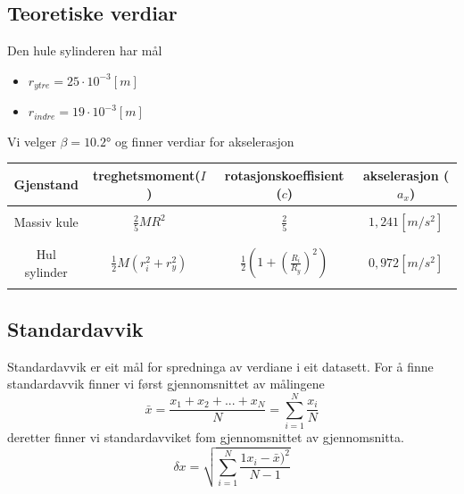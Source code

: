 \documentclass[12pt,a4paper]{article}
\begin{document}
  \subsection{Teoretiske verdiar}
  Den hule sylinderen har mål
  \begin{itemize}
    \item $r_{ytre} = 25\cdot10^{-3}[m]$
    \item $r_{indre} = 19\cdot10^{-3}[m]$
  \end{itemize}
  Vi velger $\beta = \ang{10.2}$ og finner verdiar for akselerasjon
  \begin{center}
    \begin{tabular}{|c|c|c|c|}
      \hline
      Gjenstand &  treghetsmoment($I$)  &  rotasjonskoeffisient ($c$)  &  
      akselerasjon ($a_x$) \\
      \hline
      &&&\\
      Massiv kule  &  $\frac{2}{5}MR^2$ &  $\frac{2}{5}$  &  $1,241[m/s^2]$ \\
      &&&\\
      \hline
      &&&\\
      Hul sylinder  &  $\frac{1}{2}M(r^2_i + r^2_y)$ &  
      $\frac{1}{2}\left( 1 + \left(\frac{R_i}{R_y}\right) ^2 \right)$  &  $0,972[m/s^2]$ \\
      &&&\\
      \hline
    \end{tabular}
  \end{center}

  \subsection{Standardavvik}
  Standardavvik er eit mål for spredninga av verdiane i eit datasett.
  For å finne standardavvik finner vi først gjennomsnittet av målingene
  \begin{equation}
    \bar{x} = \frac{x_1 + x_2 + ... + x_N}{N} = \sum_{i=1}^{N} \frac{x_i}{N}
  \end{equation}
  deretter finner vi standardavviket fom gjennomsnittet av gjennomsnitta.
  \begin{equation}
    \delta x = \sqrt{ \sum_{i=1}^{N} \frac{1x_i - \bar{x}) ^2}{N - 1}}
  \end{equation}
\end{document}

